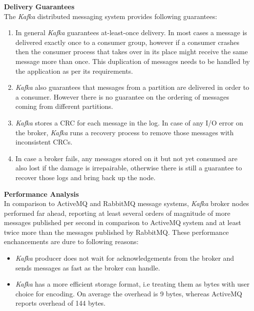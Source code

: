 \documentclass[12pt, a4paper]{article}
\begin{document}
\textbf{Delivery Guarantees}\\
The \textit{Kafka} distributed messaging system provides following guarantees:
\begin{enumerate}
    \item In general \textit{Kafka} guarantees at-least-once delivery. In most cases a message is delivered exactly once to a consumer group, however if a consumer crashes then the consumer process that takes over in its place might receive the same message more than once. This duplication of messages needs to be handled by the application as per its requirements.

    \item \textit{Kafka} also guarantees that messages from a partition are delivered in order to a consumer. However there is no guarantee on the ordering of messages coming from different partitions.

    \item \textit{Kafka} stores a CRC for each message in the log. In case of any I/O error on the broker, \textit{Kafka} runs a recovery process to remove those messages with inconsistent CRCs.

    \item In case a broker fails, any messages stored on it but not yet consumed are also lost if the damage is irrepairable, otherwise there is still a guarantee to recover those logs and bring back up the node.

\end{enumerate}

\textbf{Performance Analysis}\\
In comparison to ActiveMQ and RabbitMQ message systems, \textit{Kafka} broker nodes performed far ahead, reporting at least several orders of magnitude of more messages published per second in comparison to ActiveMQ system and at least twice more than the messages published by RabbitMQ. These performance enchancements are dure to following reasons:
\begin{itemize}
    \item \textit{Kafka} producer does not wait for acknowledgements from the broker and sends messages as fast as the broker can handle.

    \item \textit{Kafka} has a more efficient storage format, i.e treating them as bytes with user choice for encoding. On average the overhead is 9 bytes, whereas ActiveMQ reports overhead of 144 bytes.
\end{itemize}
\end{document}
